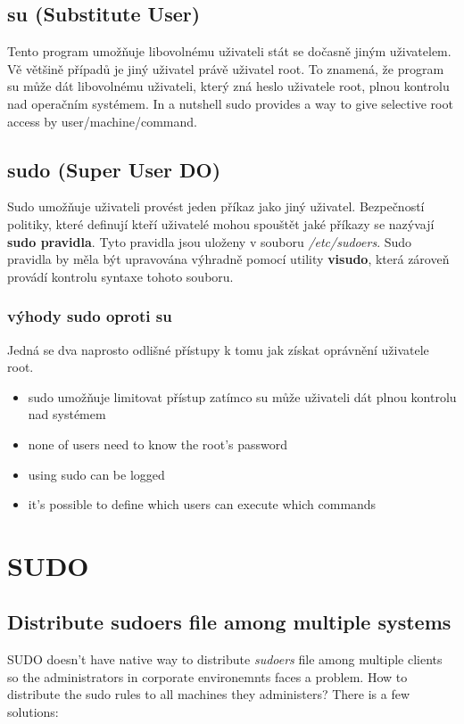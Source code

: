\documentclass[12pt,a4paper,titlepage,final]{article}
\begin{document}
\subsection{su (Substitute User)}
Tento program umožňuje libovolnému uživateli stát se dočasně jiným uživatelem.
Vě většině případů je jiný uživatel právě uživatel root. To znamená, že program
su může dát libovolnému uživateli, který zná heslo uživatele root, plnou
kontrolu nad operačním systémem. In a nutshell sudo provides a way to give
selective root access by user/machine/command.


\subsection{sudo (Super User DO)}
Sudo umožňuje uživateli provést jeden příkaz jako jiný uživatel. Bezpečností
politiky, které definují kteří uživatelé mohou spouštět jaké příkazy se nazývají 
\textbf{sudo pravidla}. Tyto pravidla jsou uloženy v souboru
\emph{/etc/sudoers}. Sudo pravidla by měla být upravována výhradně pomocí
utility \textbf{visudo}, která zároveň provádí kontrolu syntaxe tohoto souboru.

\subsubsection{výhody sudo oproti su}
Jedná se dva naprosto odlišné přístupy k tomu jak získat oprávnění uživatele
root.

\begin{itemize}
	\item sudo umožňuje limitovat přístup zatímco su může uživateli dát plnou
		kontrolu nad systémem
	\item none of users need to know the root's password
	\item using sudo can be logged
	\item it's possible to define which users can execute which commands
\end{itemize}


\section{SUDO}

\subsection{Distribute sudoers file among multiple systems}
SUDO doesn't have native way to distribute \emph{sudoers} file among multiple
clients so the administrators in corporate environemnts faces a problem. How to
distribute the sudo rules to all machines they administers? There is a few
solutions:
\end{document}
